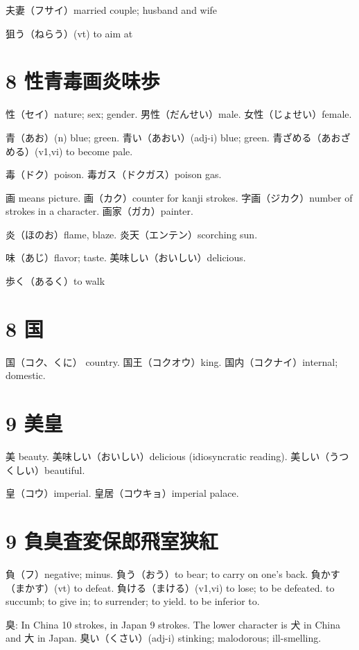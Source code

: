 夫妻（フサイ）married couple; husband and wife

狙う（ねらう）(vt) to aim at

\section{8 性青毒画炎味歩}

性（セイ）nature; sex; gender.
男性（だんせい）male.
女性（じょせい）female.

青（あお）(n) blue; green.
青い（あおい）(adj-i) blue; green.
青ざめる（あおざめる）(v1,vi) to become pale.

毒（ドク）poison.
毒ガス（ドクガス）poison gas.

画 means picture.
画（カク）counter for kanji strokes.
字画（ジカク）number of strokes in a character.
画家（ガカ）painter.

炎（ほのお）flame, blaze.
炎天（エンテン）scorching sun.

味（あじ）flavor; taste.
美味しい（おいしい）delicious.

歩く（あるく）to walk

\section{8 国}

国（コク、くに） country.
国王（コクオウ）king.
国内（コクナイ）internal; domestic.

\section{9 美皇}

美 beauty.
美味しい（おいしい）delicious (idiosyncratic reading).
美しい（うつくしい）beautiful.

皇（コウ）imperial.
皇居（コウキョ）imperial palace.

\section{9 負臭査変保郎飛室狭紅}

負（フ）negative; minus.
負う（おう）to bear; to carry on one's back.
負かす（まかす）(vt) to defeat.
負ける（まける）(v1,vi)
to lose; to be defeated.
to succumb; to give in; to surrender; to yield.
to be inferior to.

臭: In China 10 strokes, in Japan 9 strokes.
The lower character is 犬 in China and 大 in Japan.
臭い（くさい）(adj-i) stinking; malodorous; ill-smelling.

